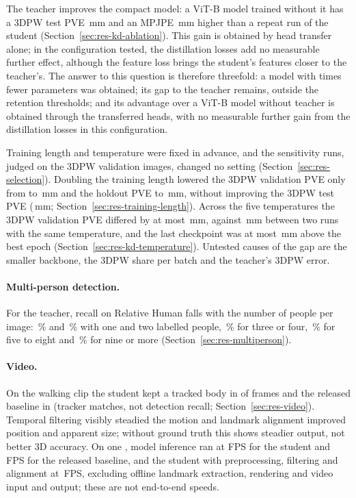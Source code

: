 The teacher improves the compact model: a ViT-B model trained without it has a 3DPW test PVE
\AblNoTeachDiffTP\,mm and an MPJPE \AblNoTeachDiffTPMPJPE\,mm higher than a repeat run of the student
(Section~\ref{sec:res-kd-ablation}). This gain is obtained by head transfer alone; in the configuration tested, the
distillation losses add no measurable further effect, although the feature loss brings the student's features
closer to the teacher's. The answer to this question is therefore threefold: a
model with \ParamRatioStudent{} times fewer parameters was obtained; its gap to the teacher remains, outside the
retention thresholds; and its advantage over a ViT-B model without teacher is obtained through the transferred heads, with no
measurable further gain from the distillation losses in this configuration.

Training length and temperature were fixed in advance, and the sensitivity runs, judged on the 3DPW validation
images, changed no setting (Section~\ref{sec:res-selection}). Doubling the training length lowered the 3DPW validation PVE only from
\SelThirtyValPVE{} to \SelSixtyValPVE\,mm and the holdout PVE to \StudentSixtyPVE\,mm, without improving the 3DPW
test PVE (\StudentSixtyThreeDPW\,mm; Section~\ref{sec:res-training-length}). Across the five temperatures the 3DPW
validation PVE differed by at most \SwValSpread\,mm, against \AblRunDiffVal\,mm between two runs with the same
temperature, and the last checkpoint was at most \SwValMaxGap\,mm above the best epoch
(Section~\ref{sec:res-kd-temperature}). Untested causes of the gap are the smaller backbone, the 3DPW share per
batch and the teacher's 3DPW error.

\paragraph{Multi-person detection.}
For the teacher, recall on Relative Human falls with the number of people per image: \CrowdFinalOneRec\,\% and
\CrowdFinalTwoRec\,\% with one and two labelled people, \CrowdFinalThreeFourRec\,\% for three or four,
\CrowdFinalFiveEightRec\,\% for five to eight and \CrowdFinalNinePlusRec\,\% for nine or more
(Section~\ref{sec:res-multiperson}).

\paragraph{Video.}
On the walking clip the student kept a tracked body in \VideoStudentMatched{} of \VideoFrames{} frames
and the released baseline in \VideoBaselineMatched{} (tracker matches, not detection recall;
Section~\ref{sec:res-video}).
Temporal filtering visibly steadied the motion and landmark alignment improved position and apparent size; without
ground truth this shows steadier output, not better 3D accuracy. On one \VideoGPU{}, model inference ran at
\VideoStudentRawFPS{} FPS for the student and \VideoNAVERFPS\,FPS for the released baseline, and the student with
preprocessing, filtering and alignment at \VideoAlignedPipeFPS\,FPS, excluding offline landmark extraction,
rendering and video input and output; these are not end-to-end speeds.

